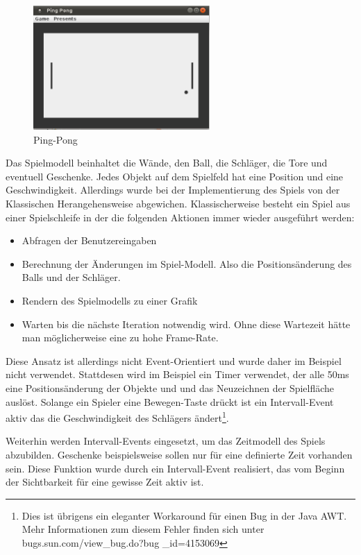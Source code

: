 \begin{figure}[htp]
\begin{center}
  \includegraphics[width=0.6\textwidth]{graphics/pingpong.eps}
  \caption{Ping-Pong}
  \label{ping_pong}
\end{center}
\end{figure}

Das Spielmodell beinhaltet die Wände, den Ball, die Schläger, die Tore und
eventuell Geschenke. Jedes Objekt auf dem Spielfeld hat eine Position und eine
Geschwindigkeit. Allerdings wurde bei der Implementierung des Spiels von der
Klassischen Herangehensweise abgewichen. Klassischerweise besteht ein Spiel aus
einer Spielschleife in der die folgenden Aktionen immer wieder ausgeführt
werden:
\begin{itemize}
  \item Abfragen der Benutzereingaben
  \item Berechnung der Änderungen im Spiel-Modell. Also die Positionsänderung
  des Balls und der Schläger.
  \item Rendern des Spielmodells zu einer Grafik
  \item Warten bis die nächste Iteration notwendig wird. Ohne diese Wartezeit
  hätte man möglicherweise eine zu hohe Frame-Rate.
\end{itemize}


Diese Ansatz ist allerdings nicht Event-Orientiert und wurde daher im Beispiel
nicht verwendet. Stattdesen wird im Beispiel ein Timer verwendet, der alle 50ms
eine Positionsänderung der Objekte und und das Neuzeichnen der Spielfläche auslöst.
Solange ein Spieler eine Bewegen-Taste drückt ist ein Intervall-Event aktiv das
die Geschwindigkeit des Schlägers ändert\footnote{Dies ist übrigens ein
eleganter Workaround für einen Bug in der Java AWT. Mehr Informationen zum
diesem Fehler finden sich unter
bugs.sun.com/view\_bug.do?bug \_id=4153069}.

Weiterhin werden Intervall-Events eingesetzt, um das Zeitmodell des Spiels
abzubilden. Geschenke beispielsweise sollen nur für eine definierte Zeit
vorhanden sein. Diese Funktion wurde durch ein Intervall-Event realisiert, das
vom Beginn der Sichtbarkeit für eine gewisse Zeit aktiv ist. 


